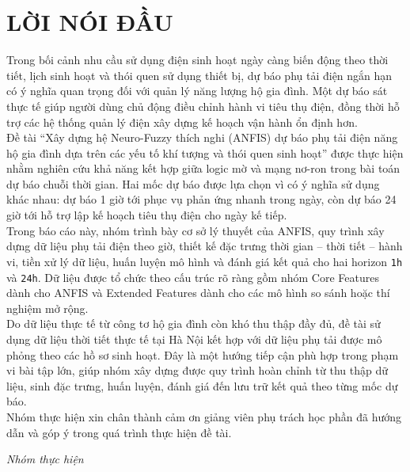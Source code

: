 \chapter*{LỜI NÓI ĐẦU}

Trong bối cảnh nhu cầu sử dụng điện sinh hoạt ngày càng biến động theo thời tiết, lịch sinh hoạt và thói quen sử dụng thiết bị, dự báo phụ tải điện ngắn hạn có ý nghĩa quan trọng đối với quản lý năng lượng hộ gia đình. Một dự báo sát thực tế giúp người dùng chủ động điều chỉnh hành vi tiêu thụ điện, đồng thời hỗ trợ các hệ thống quản lý điện xây dựng kế hoạch vận hành ổn định hơn.
\\
Đề tài ``Xây dựng hệ Neuro-Fuzzy thích nghi (ANFIS) dự báo phụ tải điện năng hộ gia đình dựa trên các yếu tố khí tượng và thói quen sinh hoạt'' được thực hiện nhằm nghiên cứu khả năng kết hợp giữa logic mờ và mạng nơ-ron trong bài toán dự báo chuỗi thời gian. Hai mốc dự báo được lựa chọn vì có ý nghĩa sử dụng khác nhau: dự báo 1 giờ tới phục vụ phản ứng nhanh trong ngày, còn dự báo 24 giờ tới hỗ trợ lập kế hoạch tiêu thụ điện cho ngày kế tiếp.
\\
Trong báo cáo này, nhóm trình bày cơ sở lý thuyết của ANFIS, quy trình xây dựng dữ liệu phụ tải điện theo giờ, thiết kế đặc trưng thời gian -- thời tiết -- hành vi, tiền xử lý dữ liệu, huấn luyện mô hình và đánh giá kết quả cho hai horizon \texttt{1h} và \texttt{24h}. Dữ liệu được tổ chức theo cấu trúc rõ ràng gồm nhóm Core Features dành cho ANFIS và Extended Features dành cho các mô hình so sánh hoặc thí nghiệm mở rộng.
\\
Do dữ liệu thực tế từ công tơ hộ gia đình còn khó thu thập đầy đủ, đề tài sử dụng dữ liệu thời tiết thực tế tại Hà Nội kết hợp với dữ liệu phụ tải được mô phỏng theo các hồ sơ sinh hoạt. Đây là một hướng tiếp cận phù hợp trong phạm vi bài tập lớn, giúp nhóm xây dựng được quy trình hoàn chỉnh từ thu thập dữ liệu, sinh đặc trưng, huấn luyện, đánh giá đến lưu trữ kết quả theo từng mốc dự báo.
\\
Nhóm thực hiện xin chân thành cảm ơn giảng viên phụ trách học phần đã hướng dẫn và góp ý trong quá trình thực hiện đề tài.

\begin{flushright}
  \textit{Nhóm thực hiện}
\end{flushright}
